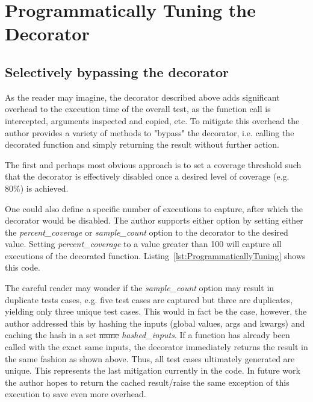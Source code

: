 \documentclass[10pt, conference]{IEEEtran}
\makeatletter
\providecommand{\DIFadd}[1]{{\protect\color{blue}\uwave{#1}}} %
\providecommand{\DIFdel}[1]{{\protect\color{red}\sout{#1}}} %
\providecommand{\DIFaddbegin}{} %
\providecommand{\DIFaddend}{} %
\providecommand{\DIFdelbegin}{} %
\providecommand{\DIFdelend}{} %
\newcommand{\DIFscaledelfig}{0.5}
\newlength{\DIFdelgraphicswidth} %
\newlength{\DIFdelgraphicsheight} %
\newcommand{\DIFaddincludegraphics}[2][]{{\color{blue}\fbox{\DIFOincludegraphics[#1]{#2}}}} %
\newcommand{\DIFdelincludegraphics}[2][]{%
\sbox{\DIFdelgraphicsbox}{\DIFOincludegraphics[#1]{#2}}%
\settoboxwidth{\DIFdelgraphicswidth}{\DIFdelgraphicsbox} %
\settoboxtotalheight{\DIFdelgraphicsheight}{\DIFdelgraphicsbox} %
\scalebox{\DIFscaledelfig}{%
\parbox[b]{\DIFdelgraphicswidth}{\usebox{\DIFdelgraphicsbox}\\[-\baselineskip] \rule{\DIFdelgraphicswidth}{0em}}\llap{\resizebox{\DIFdelgraphicswidth}{\DIFdelgraphicsheight}{%
\setlength{\unitlength}{\DIFdelgraphicswidth}%
\begin{picture}(1,1)%
\thicklines\linethickness{2pt} %
{\color[rgb]{1,0,0}\put(0,0){\framebox(1,1){}}}%
{\color[rgb]{1,0,0}\put(0,0){\line( 1,1){1}}}%
{\color[rgb]{1,0,0}\put(0,1){\line(1,-1){1}}}%
\end{picture}%
}\hspace*{3pt}}} %
} %
\DeclareRobustCommand{\DIFaddbegin}{\DIFOaddbegin \let\includegraphics\DIFaddincludegraphics} %
\DeclareRobustCommand{\DIFaddend}{\DIFOaddend \let\includegraphics\DIFOincludegraphics} %
\DeclareRobustCommand{\DIFdelbegin}{\DIFOdelbegin \let\includegraphics\DIFdelincludegraphics} %
\DeclareRobustCommand{\DIFdelend}{\DIFOaddend \let\includegraphics\DIFOincludegraphics} %
\let\sout@orig\sout %
\renewcommand{\sout}[1]{\ifmmode\text{\sout@orig{\ensuremath{#1}}}\else\sout@orig{#1}\fi} %
\makeatother
\begin{document}
\section{Programmatically Tuning the Decorator}\label{sec:decorator tuning}

\subsection{Selectively bypassing the decorator}\label{sec:tuning-1}

As the reader may imagine, the decorator described above adds significant overhead 
to the execution time of the overall test, as the function call is intercepted,
arguments inspected and copied, etc.  To mitigate this overhead the author provides 
a variety of methods to "bypass" the decorator, i.e. calling the decorated 
function and simply returning the result without further action.

The first and perhaps most obvious approach is to set a coverage threshold such 
that the decorator is effectively disabled once a desired level of coverage 
(e.g. 80\%) is achieved. 

One could also define a specific number 
of executions to capture, after which the decorator would be disabled. 
The author supports either option by setting either the \textit{percent\_coverage} or 
\textit{sample\_count} option to the decorator to the desired value.  Setting 
\textit{percent\_coverage} to a value greater than 100 will capture all 
executions of the decorated function.  Listing~\ref{lst:ProgrammaticallyTuning}
shows this code.
\DIFdelbegin %
\DIFdelend \DIFaddbegin 
\DIFaddend 

The careful reader may wonder if the \textit{sample\_count} option may result in 
duplicate tests cases, e.g. five test cases are captured but three are duplicates, 
yielding only three unique test cases.  This would in fact be the case, however, the author 
addressed this by hashing the inputs (global values, args and kwargs) and 
caching the hash in a set \DIFdelbegin \DIFdel{name }\DIFdelend \DIFaddbegin \DIFadd{named }\DIFaddend \textit{hashed\_inputs}.  If a function has
already been called with the exact same inputs, the decorator immediately returns
the result in the same fashion as shown above. Thus, all test cases 
ultimately generated are unique.  This represents the last mitigation
currently in the code.  In future work the author hopes to return the cached 
result/raise the same exception of this execution to save even more overhead.  
\end{document}
